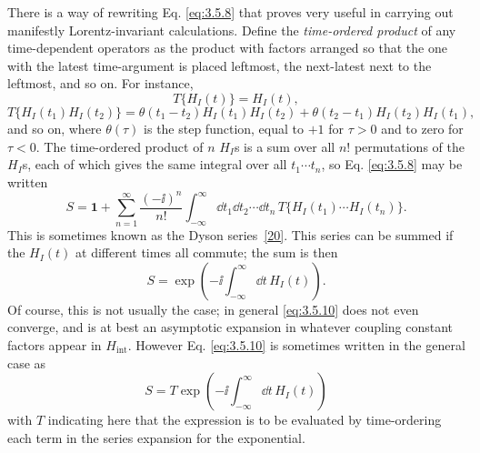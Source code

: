 There is a way of rewriting Eq. \eqref{eq:3.5.8} that proves very useful in carrying out manifestly
Lorentz-invariant calculations. Define the \emph{time-ordered product} of any time-dependent
operators as the product with factors arranged so that the one with the latest time-argument
is placed leftmost, the next-latest next to the leftmost, and so on. For instance,
\[
 T\{H_I(t)\}=H_I(t),
\]
\[
 T\{H_I(t_1)H_I(t_2)\}=\theta(t_1-t_2)H_I(t_1)H_I(t_2)
 +\theta(t_2-t_1)H_I(t_2)H_I(t_1),
\]
and so on, where $\theta(\tau)$ is the step function, equal to $+1$ for $\tau>0$ and to zero
for $\tau<0$. The time-ordered product of $n$ $H_I$s is a sum over all $n!$ permutations of
the $H_I$s, each of which gives the same integral over all $t_1\cdots t_n$, so Eq. \eqref{eq:3.5.8}
may be written
\begin{equation}
 S=\mathbf{1}+\sum_{n=1}^{\infty}\frac{(-\ii)^n}{n!}
 \int_{-\infty}^{\infty}\dd t_1\dd t_2\cdots \dd t_n\,
 T\{H_I(t_1)\cdots H_I(t_n)\}.
 \tag{3.5.10}\label{eq:3.5.10}
\end{equation}
This is sometimes known as the Dyson series~\hyperref[ref:3.20]{[20]}. This series can be summed if the $H_I(t)$
at different times all commute; the sum is then
\[
 S=\exp\left(-\ii\int_{-\infty}^{\infty}\dd t\,H_I(t)\right).
\]
Of course, this is not usually the case; in general \eqref{eq:3.5.10} does not even converge, and is at
best an asymptotic expansion in whatever coupling constant factors appear in $H_{\mathrm{int}}$.
However Eq. \eqref{eq:3.5.10} is sometimes written in the general case as
\[
 S=T\exp\left(-\ii\int_{-\infty}^{\infty}\dd t\,H_I(t)\right)
\]
with $T$ indicating here that the expression is to be evaluated by time-ordering each term in
the series expansion for the exponential.

